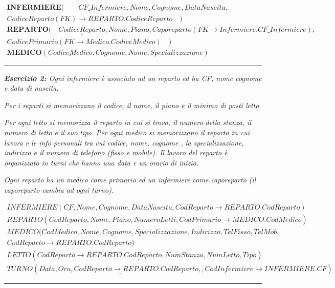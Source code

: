 \documentclass{article}
\begin{document}
\begin{align*}
    \textbf{INFERMIERE}(\quad\quad \underline{CF\_Infermiere}, Nome, Cognome, DataNascita,\quad \\ CodiceReparto(FK)\to REPARTO.CodiceReparto  \quad)\\
    \textbf{REPARTO}( \quad \underline{CodiceReparto}, Nome, Piano, Caporeparto (FK \to Infermiere.CF\_Infermiere),\quad \\CodicePrimario(FK \to Medico.CodiceMedico) \quad  ) \\
    \textbf{MEDICO}(\underline{CodiceMedico}, Cognome, Nome, Specializzazione)
\end{align*}

 \par\rule{\textwidth}{0.5pt} 

\textit{\textbf{Esercizio 2:} Ogni infermiere è associato ad un reparto ed ha CF, nome cognome e data di nascita.}
 
\textit{Per i reparti si memorizzano il codice, il nome, il piano e il minimo di posti letto.}
 
\textit{Per ogni letto si memorizza il reparto in cui si trova, il numero della stanza, il numero di letto e il suo tipo.
} 
\textit{Per ogni medico si memorizzano il reparto in cui lavora e le info personali tra cui codice, nome, cognome , la specializzazione, indirizzo e il numero di telefono (fisso e mobile).
} 
\textit{Il lavoro del reparto è organizzato in turni che hanno una data e un orario di inizio.}

\textit{Ogni reparto ha un medico come primario ed un infermiere come caporeparto (il caporeparto cambia ad ogni turno).}

\begin{align*}
    INFERMIERE(\underline{CF},Nome, Cognome, DataNascita, CodReparto \to REPARTO.CodReparto) \\
    REPARTO(\underline{CodReparto}, Nome, Piano, NumeroLetti, CodPrimario \to MEDICO.CodMedico) \\
    MEDICO (\underline{CodMedico}, Nome, Cognome, Specializzazione, Indirizzo, TelFisso, TelMob, \quad \\ CodReparto \to REPARTO.CodReparto)
    \\ LETTO ( \underline{CodReparto \to REPARTO.CodReparto, NumStanza, NumLetto}, Tipo)
    \\ TURNO (\underline{Data, Ora, CodReparto \to REPARTO.CodReparto, }, CodInfermiere \to INFERMIERE.CF)
\end{align*}
\par\rule{\textwidth}{0.5pt} 
\end{document}
